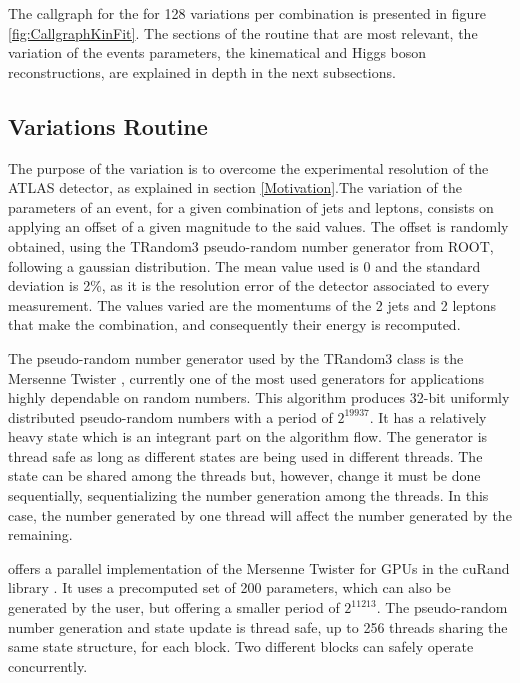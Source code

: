 The callgraph for the \ttDilepKinFit for 128 variations per combination is presented in figure \ref{fig:CallgraphKinFit}. The sections of the routine that are most relevant, the variation of the events parameters, the kinematical and Higgs boson reconstructions, are explained in depth in the next subsections.

\subsection{Variations Routine}
\label{Application:Variations}

The purpose of the variation is to overcome the experimental resolution of the ATLAS detector, as explained in section \ref{Motivation}.The variation of the parameters of an event, for a given combination of jets and leptons, consists on applying an offset of a given magnitude to the said values. The offset is randomly obtained, using the TRandom3 pseudo-random number generator from ROOT, following a gaussian distribution. The mean value used is 0 and the standard deviation is 2\%, as it is the resolution error of the detector associated to every measurement. The values varied are the momentums of the 2 jets and 2 leptons that make the combination, and consequently their energy is recomputed.

The pseudo-random number generator used by the TRandom3 class is the Mersenne Twister \cite{MersenneTwister}, currently one of the most used generators for applications highly dependable on random numbers. This algorithm produces 32-bit uniformly distributed pseudo-random numbers with a period of $2^{19937}$. It has a relatively heavy state which is an integrant part on the algorithm flow. The generator is thread safe as long as different states are being used in different threads. The state can be shared among the threads but, however, change it must be done sequentially, sequentializing the number generation among the threads. In this case, the number generated by one thread will affect the number generated by the remaining.

\nvidia offers a parallel implementation of the Mersenne Twister for GPUs in the cuRand library \cite{NVIDIA:MersenneTwister}. It uses a precomputed set of 200 parameters, which can also be generated by the user, but offering a smaller period of $2^{11213}$. The pseudo-random number generation and state update is thread safe, up to 256 threads sharing the same state structure, for each block. Two different blocks can safely operate concurrently.


